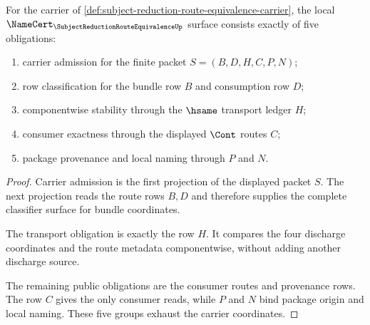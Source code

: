 \begin{theorem}
\label{thm:subject-reduction-route-equivalence-namecert-obligations}
For the carrier of \autoref{def:subject-reduction-route-equivalence-carrier}, the local $\NameCert_{\SubjectReductionRouteEquivalenceUp}$ surface consists exactly of five obligations:
\begin{enumerate}
\item carrier admission for the finite packet $S=(B,D,H,C,P,N)$;
\item row classification for the bundle row $B$ and consumption row $D$;
\item componentwise stability through the $\hsame$ transport ledger $H$;
\item consumer exactness through the displayed $\Cont$ routes $C$;
\item package provenance and local naming through $P$ and $N$.
\end{enumerate}
\end{theorem}
\begin{proof}
Carrier admission is the first projection of the displayed packet $S$. The next projection reads the route rows $B,D$ and therefore supplies the complete classifier surface for bundle coordinates.

The transport obligation is exactly the row $H$. It compares the four discharge coordinates and the route metadata componentwise, without adding another discharge source.

The remaining public obligations are the consumer routes and provenance rows. The row $C$ gives the only consumer reads, while $P$ and $N$ bind package origin and local naming. These five groups exhaust the carrier coordinates.
\end{proof}

